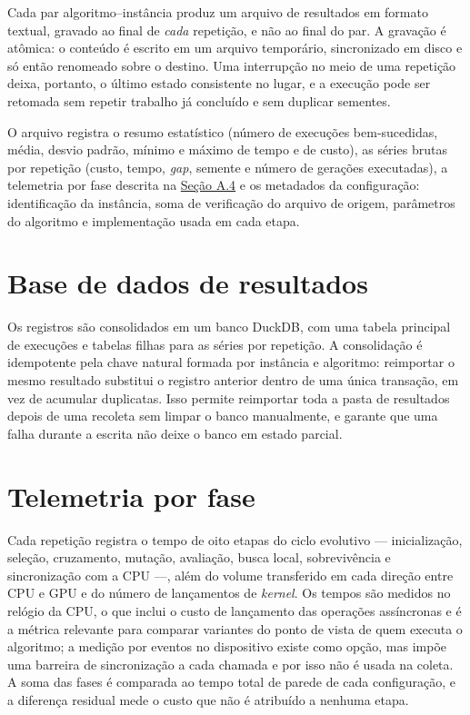 Cada par algoritmo--instância produz um arquivo de resultados em formato textual, gravado ao final de \emph{cada} repetição, e não ao final do par.
A gravação é atômica: o conteúdo é escrito em um arquivo temporário, sincronizado em disco e só então renomeado sobre o destino.
Uma interrupção no meio de uma repetição deixa, portanto, o último estado consistente no lugar, e a execução pode ser retomada sem repetir trabalho já concluído e sem duplicar sementes.

O arquivo registra o resumo estatístico (número de execuções bem-sucedidas, média, desvio padrão, mínimo e máximo de tempo e de custo), as séries brutas por repetição (custo, tempo, \emph{gap}, semente e número de gerações executadas), a telemetria por fase descrita na \hyperref[apendice-telemetria]{Seção A.4} e os metadados da configuração: identificação da instância, soma de verificação do arquivo de origem, parâmetros do algoritmo e implementação usada em cada etapa.

\section{Base de dados de resultados}\label{apendice-banco}

Os registros são consolidados em um banco DuckDB, com uma tabela principal de execuções e tabelas filhas para as séries por repetição.
A consolidação é idempotente pela chave natural formada por instância e algoritmo: reimportar o mesmo resultado substitui o registro anterior dentro de uma única transação, em vez de acumular duplicatas.
Isso permite reimportar toda a pasta de resultados depois de uma recoleta sem limpar o banco manualmente, e garante que uma falha durante a escrita não deixe o banco em estado parcial.

\section{Telemetria por fase}\label{apendice-telemetria}

Cada repetição registra o tempo de oito etapas do ciclo evolutivo --- inicialização, seleção, cruzamento, mutação, avaliação, busca local, sobrevivência e sincronização com a CPU ---, além do volume transferido em cada direção entre CPU e GPU e do número de lançamentos de \emph{kernel}.
Os tempos são medidos no relógio da CPU, o que inclui o custo de lançamento das operações assíncronas e é a métrica relevante para comparar variantes do ponto de vista de quem executa o algoritmo; a medição por eventos no dispositivo existe como opção, mas impõe uma barreira de sincronização a cada chamada e por isso não é usada na coleta.
A soma das fases é comparada ao tempo total de parede de cada configuração, e a diferença residual mede o custo que não é atribuído a nenhuma etapa.


